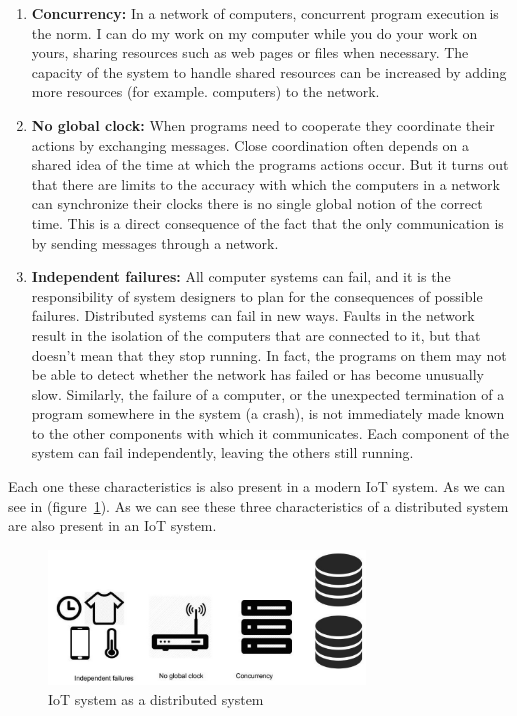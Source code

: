 \begin{enumerate}

\item \textbf{Concurrency:}
In a network of computers, concurrent program execution is the norm. I can
do my work on my computer while you do your work on yours, sharing resources
such as web pages or files when necessary. The capacity of the system to handle
shared resources can be increased by adding more resources (for example.
computers) to the network.

\item \textbf{No global clock:}
When programs need to cooperate they coordinate their actions
by exchanging messages. Close coordination often depends on a shared idea of
the time at which the programs actions occur. But it turns out that there are
limits to the accuracy with which the computers in a network can synchronize
their clocks there is no single global notion of the correct time. This is a
direct consequence of the fact that the only communication is by sending
messages through a network.

\item \textbf{Independent failures:}
All computer systems can fail, and it is the
responsibility of system designers to plan for the consequences of possible
failures. Distributed systems can fail in new ways. Faults in the network
result in the isolation of the computers that are connected to it, but that
doesn't mean that they stop running. In fact, the programs on them may not be
able to detect whether the network has failed or has become unusually slow.
Similarly, the failure of a computer, or the unexpected termination of a
program somewhere in the system (a crash), is not immediately made known to the
other components with which it communicates. Each component of the system can
fail independently, leaving the others still running.

\end{enumerate}


Each one these characteristics is also present in a modern IoT system. As we can
see in (figure~\ref{fig:3.1}). As we can see these three characteristics of a
distributed system are also present in an IoT system. 

\begin{figure}[H]
\centering
\includegraphics[width=0.75\textwidth]{images/IoT_distributed.jpg}
\caption{IoT system as a distributed system}
\label{fig:3.1}
\end{figure}


